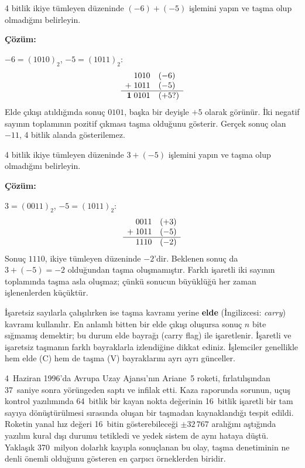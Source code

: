 \begin{ornek}[A.19]
4 bitlik ikiye tümleyen düzeninde $(-6) + (-5)$ işlemini yapın ve taşma olup olmadığını belirleyin.

\textbf{Çözüm:}

$-6 = (1010)_2$, $-5 = (1011)_2$:
\[
\begin{array}{r@{\quad}l}
  1010 & (-6)\\
+\; 1011 & (-5)\\
\hline
\mathbf{1}\;0101 & (+5\text{?})
\end{array}
\]
Elde çıkışı atıldığında sonuç $0101$, başka bir deyişle $+5$ olarak görünür. İki negatif sayının toplamının pozitif çıkması taşma olduğunu gösterir. Gerçek sonuç olan $-11$, 4 bitlik alanda gösterilemez.
\end{ornek}

\begin{ornek}[A.20]
4 bitlik ikiye tümleyen düzeninde $3 + (-5)$ işlemini yapın ve taşma olup olmadığını belirleyin.

\textbf{Çözüm:}

$3 = (0011)_2$, $-5 = (1011)_2$:
\[
\begin{array}{r@{\quad}l}
  0011 & (+3)\\
+\; 1011 & (-5)\\
\hline
  1110 & (-2)
\end{array}
\]
Sonuç $1110$, ikiye tümleyen düzeninde $-2$'dir. Beklenen sonuç da $3 + (-5) = -2$ olduğundan taşma oluşmamıştır. Farklı işaretli iki sayının toplamında taşma asla oluşmaz; çünkü sonucun büyüklüğü her zaman işlenenlerden küçüktür.
\end{ornek}

İşaretsiz sayılarla çalışılırken ise taşma kavramı yerine \textbf{elde} (İngilizcesi: \textit{carry}) kavramı kullanılır. En anlamlı bitten bir elde çıkışı oluşursa sonuç $n$ bite sığmamış demektir; bu durum elde bayrağı (carry flag) ile işaretlenir. İşaretli ve işaretsiz taşmanın farklı bayraklarla izlendiğine dikkat ediniz. İşlemciler genellikle hem elde (C) hem de taşma (V) bayraklarını ayrı ayrı günceller.

\begin{bilginot}
4~Haziran 1996'da Avrupa Uzay Ajansı'nın Ariane~5 roketi, fırlatılışından 37~saniye sonra yörüngeden saptı ve infilak etti. Kaza raporunda sorunun, uçuş kontrol yazılımında 64~bitlik bir kayan nokta değerinin 16~bitlik işaretli bir tam sayıya dönüştürülmesi sırasında oluşan bir taşmadan kaynaklandığı tespit edildi. Roketin yanal hız değeri 16~bitin gösterebileceği $\pm 32\,767$ aralığını aştığında yazılım kural dışı durumu tetikledi ve yedek sistem de aynı hataya düştü. Yaklaşık 370~milyon dolarlık kayıpla sonuçlanan bu olay, taşma denetiminin ne denli önemli olduğunu gösteren en çarpıcı örneklerden biridir.
\end{bilginot}

